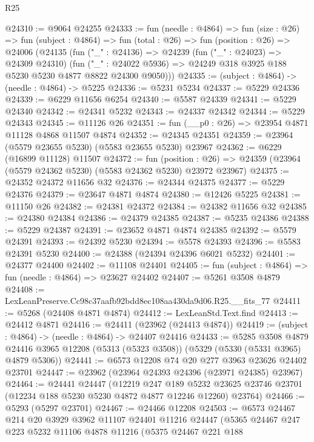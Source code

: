 \begin{lexlean}{R25}
\begin{coremodule}
@24310 := @9064 @24255
@24333 := fun (needle : @4864) =>
  fun (size : @26) =>
  fun (subject : @4864) =>
  fun (total : @26) =>
  fun (position : @26) =>
  @24006
    (@24135
      (fun ("_" : @24136) =>
      @24239
        (fun ("_" : @24023) => @24309 @24310)
        (fun ("_" : @24022 @5936) => @24249 @318 @3925 @188 @5230 @5230 @4877 @8822 @24300 @9050)))
@24335 := (subject : @4864) -> (needle : @4864) -> @5225
@24336 := @5231 @5234
@24337 := @5229 @24336
@24339 := @6229 @11656 @6254
@24340 := @5587 @24339
@24341 := @5229 @24340
@24342 := @24341 @5232
@24343 := @24337 @24342
@24344 := @5229 @24343
@24345 := @11126 @26
@24351 := fun (__p0 : @26) => @23954 @4871 @11128 @4868 @11507 @4874
@24352 := @24345 @24351
@24359 := @23964 (@5579 @23655 @5230) (@5583 @23655 @5230) @23967
@24362 := @6229 (@16899 @11128) @11507
@24372 := fun (position : @26) =>
  @24359 (@23964 (@5579 @24362 @5230) (@5583 @24362 @5230) @23972 @23967)
@24375 := @24352 @24372 @11656 @32
@24376 := @24344 @24375
@24377 := @5229 @24376
@24379 := @23647 @4871 @4874
@24380 := @12426 @5225
@24381 := @11150 @26
@24382 := @24381 @24372
@24384 := @24382 @11656 @32
@24385 := @24380 @24384
@24386 := @24379 @24385
@24387 := @5235 @24386
@24388 := @5229 @24387
@24391 := @23652 @4871 @4874 @24385
@24392 := @5579 @24391
@24393 := @24392 @5230
@24394 := @5578 @24393
@24396 := @5583 @24391 @5230
@24400 := @24388 (@24394 @24396 @6021 @5232)
@24401 := @24377 @24400
@24402 := @11108 @24401
@24405 := fun (subject : @4864) => fun (needle : @4864) => @23627 @24402
@24407 := @5261 @3508 @4879
@24408 := LexLeanPreserve.Cc98c37aafb92bdd8ec108aa430da9d06.R25.__fits_77
@24411 := @5268 (@24408 @4871 @4874)
@24412 := LexLeanStd.Text.find
@24413 := @24412 @4871
@24416 := @24411 (@23962 (@24413 @4874))
@24419 := (subject : @4864) -> (needle : @4864) -> @24407 @24416
@24433 := @5285
    @3508
    @4879
    @24416
    @3965
    @12208
    (@5313 (@5323 @3508))
    (@5329 (@5330 (@5331 @3965) @4879 @5306))
@24441 := @6573 @12208 @74 @20 @277 @3963 @23626 @24402 @23701
@24447 := @23962 (@23964 @24393 @24396 (@23971 @24385) @23967)
@24464 := @24441
    @24447
    (@12219
      @247
      @189
      @5232
      @23625
      @23746
      @23701
      (@12234 @188 @5230 @5230 @4872 @4877 @12246 @12260)
      @23764)
@24466 := @5293 (@5297 @23701)
@24467 := @24466 @12208
@24503 := @6573
    @24467
    @214
    @20
    @3929
    @3962
    @11107
    @24401
    @11216
    @24447
    (@5365
      @24467
      @247
      @223
      @5232
      @11106
      @4878
      @11216
      (@5375
        @24467
        @221
        @188

\end{coremodule}
\end{lexlean}
